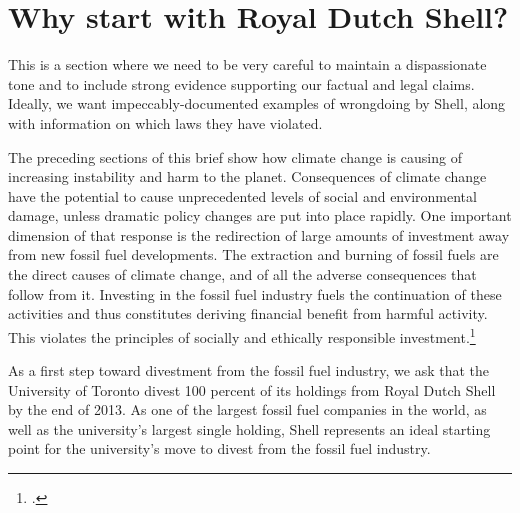 


		\singlespacing
		\section{Why start with Royal Dutch Shell?}
		\label{sec:Shell}
		\doublespacing






\begin{vcom}
This is a section where we need to be very careful to maintain a dispassionate tone and to include strong evidence supporting our factual and legal claims. Ideally, we want impeccably-documented examples of wrongdoing by Shell, along with information on which laws they have violated.
\end{vcom}



The preceding sections of this brief show how climate change is causing of increasing instability and harm to the planet.
Consequences of climate change have the potential to cause unprecedented levels of social and environmental damage, unless dramatic policy changes are put into place rapidly. 
One important dimension of that response is the redirection of large amounts of investment away from new fossil fuel developments.
The extraction and burning of fossil fuels are the direct causes of climate change, and of all the adverse consequences that follow from it. 
Investing in the fossil fuel industry fuels the continuation of these activities and thus constitutes deriving financial benefit from harmful activity.
This violates the principles of socially and ethically responsible investment.\footcite[][]{Richardson_2008}



As a first step toward divestment from the fossil fuel industry, we ask that the University of Toronto divest 100 percent of its holdings from Royal Dutch Shell by the end of 2013. 
As one of the largest fossil fuel companies in the world, as well as the university's largest single holding, Shell represents an ideal starting point for the university's move to divest from the fossil fuel industry.
		

